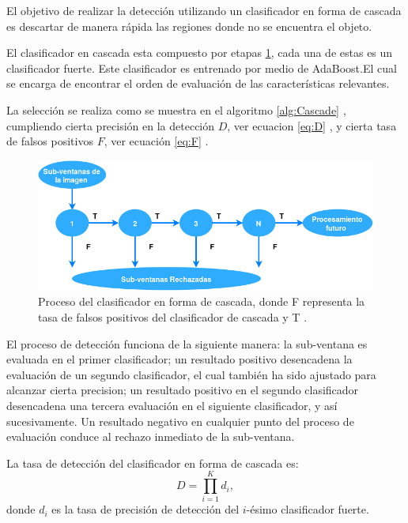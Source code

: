 El objetivo de realizar la detección utilizando un clasificador en forma de cascada es descartar de manera rápida las regiones donde no se encuentra el objeto.

El clasificador en cascada  esta compuesto por etapas \ref{fig:Cascade}, cada una de estas es un clasificador fuerte. Este clasificador es entrenado por medio de AdaBoost.El cual se encarga de encontrar el orden de evaluación de las características relevantes.  

La selección se realiza como se muestra en el algoritmo \ref{alg:Cascade} , cumpliendo cierta precisión en la detección $D$, ver ecuacion \ref{eq:D} , y cierta tasa de falsos positivos $F$, ver ecuación \ref{eq:F} .

\begin{figure}[h!]
\begin{center}
\includegraphics[scale=.60]{./Figures/DCascade.png}
\end{center}
\caption{Proceso del clasificador en forma de cascada, donde F representa la tasa de falsos positivos del clasificador de cascada y T .}
\label{fig:Cascade}
\end{figure}

El proceso de detección funciona de la siguiente manera: la sub-ventana es evaluada en el primer clasificador; un resultado positivo desencadena la evaluación de un segundo clasificador, el cual también ha sido ajustado para alcanzar cierta precision; un resultado positivo en el segundo clasificador desencadena una tercera evaluación en el siguiente clasificador, y así sucesivamente. Un resultado negativo en cualquier punto del proceso de evaluación conduce al rechazo inmediato de la sub-ventana.

La tasa de detección del clasificador en forma de cascada es: 
\begin{equation} \label{eq:D}
D = \prod^K_{i=1} d_i ,
\end{equation}
donde $d_i$ es la tasa de precisión de detección del $i$-ésimo clasificador fuerte.  

